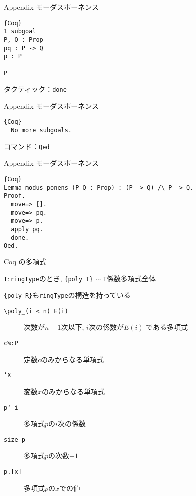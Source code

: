\documentclass[dvipdfmx,cjk]{beamer}
\theoremstyle{mystyle}
\newcommand{\0}{\textbf{0}}
\begin{document}
\begin{frame}[fragile]{Appendix モーダスポーネンス}
	\begin{screen}
	  \begin{lstlisting}{Coq}
1 subgoal
P, Q : Prop
pq : P -> Q
p : P
-------------------------------
P \end{lstlisting}
	\end{screen} \pause
	タクティック：{\tt done}
\end{frame}

\begin{frame}[fragile]{Appendix モーダスポーネンス}
	\begin{screen}
	  \begin{lstlisting}{Coq}
  No more subgoals. \end{lstlisting}
	\end{screen} \pause
	コマンド：{\tt Qed}
\end{frame}

\begin{frame}[fragile]{Appendix モーダスポーネンス}
	\begin{lstlisting}{Coq}
Lemma modus_ponens (P Q : Prop) : (P -> Q) /\ P -> Q.
Proof.
  move=> [].
  move=> pq.
  move=> p.
  apply pq.
  done.
Qed. \end{lstlisting}
\end{frame}

\begin{frame}{Coq の多項式}

	{\tt T}$\colon${\tt ringType}のとき, {\tt \{poly T\}} $\cdots$ {\tt T}係数多項式全体 
	
	{\tt \{poly R\}}も{\tt ringType}の構造を持っている
	\begin{description}
	  \item[\tt \textbackslash poly\_(i < n) E(i)] 次数が$n - 1$次以下, $i$次の係数が$E(i)$
	    である多項式
	  \item[\tt c\%:P] 定数$c$のみからなる単項式
	  \item[\tt 'X] 変数$x$のみからなる単項式
	  \item[\tt p`\_i] 多項式$p$の$i$次の係数 
	  \item[\tt size p] 多項式$p$の次数$+1$
	  \item[{\tt p.[x]}] 多項式$p$の$x$での値 
	\end{description}
\end{frame}
\end{document}
